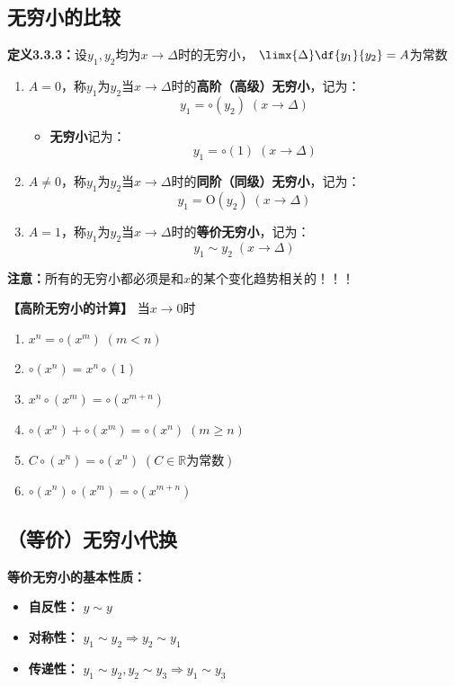 \subsection{无穷小的比较}

{\bf 定义3.3.3：}设$y_1,y_2$均为$x\to\Delta$时的无穷小，
$\limx{\Delta}\df{y_1}{y_2}=A$为常数
\begin{enumerate}[(1)]
  \setlength{\itemindent}{1cm}
  \item $A=0$，称$y_1$为$y_2$当$x\to\Delta$时的{\bf 高阶（高级）无穷小}，记为：
  $$y_1=\circ( y_2)\;(x\to\Delta)$$
  \begin{itemize}
    \item {\bf 无穷小}记为：
    $$y_1=\circ(1)\;(x\to\Delta)$$
  \end{itemize}
  \item $A\ne 0$，称$y_1$为$y_2$当$x\to\Delta$时的{\bf 同阶（同级）无穷小}，记为：
  $$y_1=\mathrm{O}( y_2)\;(x\to\Delta)$$
  \item $A=1$，称$y_1$为$y_2$当$x\to\Delta$时的{\bf 等价无穷小}，记为：
  $$y_1\sim y_2\;(x\to\Delta)$$
\end{enumerate}

{\bf 注意：}所有的无穷小都必须是和$x$的某个变化趋势相关的！！！

\begin{shaded}
	{\bf 【高阶无穷小的计算】}
	当$x\to 0$时
	\begin{enumerate}[(1)]
  	  \setlength{\itemindent}{1cm}
	  \item $x^n=\circ(x^m)\;(m<n)$ 
	  \item $\circ(x^n)=x^n\circ(1)$ 
	  \item $x^n\circ(x^m)=\circ(x^{m+n})$ 
	  \item $\circ(x^n)+\circ(x^m)=\circ(x^n)\;(m\geq n)$ 
	  \item $C\circ(x^n)=\circ(x^n)\;(C\in\mathbb{R}\mbox{为常数})$ 
	  \item $\circ(x^n)\circ(x^m)=\circ(x^{m+n})$
	\end{enumerate}
\end{shaded}

\subsection{（等价）无穷小代换}

{\bf 等价无穷小的基本性质：}
\begin{itemize}
  \setlength{\itemindent}{1cm}
  \item {\bf 自反性：} $y\sim y$ 
  \item {\bf 对称性：} $y_1\sim y_2\Rightarrow y_2\sim y_1$ 
  \item {\bf 传递性：} $y_1\sim y_2,y_2\sim y_3\Rightarrow y_1\sim y_3$ 
\end{itemize}

